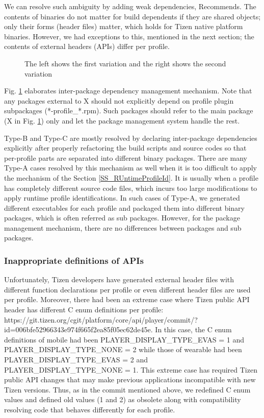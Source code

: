 We can resolve such ambiguity by adding weak dependencies, Recommends. The contents of binaries do not matter for build dependents if they are shared objects; only their forms (header files) matter, which holds for Tizen native platform binaries. However, we had exceptions to this, mentioned in the next section; the contents of external headers (APIs) differ per profile.



\begin{figure}
\label{FIG_TZN_TYPEB_RESOL}
\caption{The left shows the first variation and the right shows the second variation}
\end{figure}

Fig. \ref{FIG_TZN_TYPEB_RESOL} elaborates inter-package dependency management mechanism. Note that any packages external to X should not explicitly depend on profile plugin subpackages (*-profile\_*.rpm). Such packages should refer to the main package (X in Fig. \ref{FIG_TZN_TYPEB_RESOL}) only and let the package management system handle the rest.


Type-B and Type-C are mostly resolved by declaring inter-package dependencies explicitly after properly refactoring the build scripts and source codes so that per-profile parts are separated into different binary packages. There are many Type-A cases resolved by this mechanism as well when it is too difficult to apply the mechanism of the Section \ref{SS_RUntimeProfileId}. It is usually when a profile has completely different source code files, which incurs too large modifications to apply runtime profile identifications. In such cases of Type-A, we generated different executables for each profile and packaged them into different binary packages, which is often referred as sub packages. However, for the package management mechanism, there are no differences between packages and sub packages.


\subsubsection{Inappropriate definitions of APIs}

Unfortunately, Tizen developers have generated external header files with different function declarations per profile or even different header files are used per profile. Moreover, there had been an extreme case where Tizen public API header has different C enum definitions per profile: https://git.tizen.org/cgit/platform/core/api/player/commit/?id=006bfe52966343e974f665f2ea85f05ec62de45e. In this case, the C enum definitions of mobile had been PLAYER\_DISPLAY\_TYPE\_EVAS = 1 and PLAYER\_DISPLAY\_TYPE\_NONE = 2 while those of wearable had been PLAYER\_DISPLAY\_TYPE\_EVAS = 2 and PLAYER\_DISPLAY\_TYPE\_NONE = 1. This extreme case has required Tizen public API changes that may make previous applications incompatible with new Tizen versions. Thus, as in the commit mentioned above, we redefined C enum values and defined old values (1 and 2) as obsolete along with compatibility resolving code that behaves differently for each profile.


